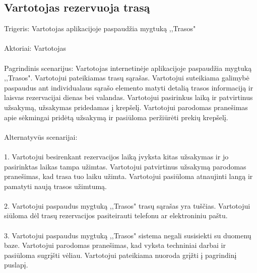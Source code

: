 \documentclass[oneside]{VUMIFPSkursinis}
\begin{document}
\subsection{Vartotojas rezervuoja trasą}
	Trigeris: Vartotojas aplikacijoje paspaudžia mygtuką ,,Trasos"\\ \\
	Aktoriai: Vartotojas\\ \\
	Pagrindinis scenarijus: Vartotojas internetinėje aplikacijoje paspaudžia mygtuką ,,Trasos". Vartotojui pateikiamas trasų sąrašas. Vartotojui suteikiama galimybė paspaudus ant individualaus sąrašo elemento matyti detalią trasos informaciją ir laisvas rezervacijai dienas bei valandas. Vartotojui pasirinkus laiką ir patvirtinus užsakymą, užsakymas pridedamas į krepšelį. Vartotojui parodomas pranešimas apie sėkmingai pridėtą užsakymą ir pasiūloma peržiūrėti prekių krepšelį.\\ \\
	Alternatyvūs scenarijai:\\ \\
1. Vartotojui besirenkant rezervacijos laiką įvyksta kitas užsakymas ir jo pasirinktas laikas tampa užimtas. Vartotojui patvirtinus užsakymą parodomas pranešimas, kad trasa tuo laiku užimta. Vartotojui pasiūloma atnaujinti langą ir pamatyti naują trasos užimtumą.\\ \\
2. Vartotojui paspaudus mygtuką ,,Trasos" trasų sąrašas yra tuščias. Vartotojui siūloma dėl trasų rezervacijos pasiteirauti telefonu ar elektroniniu paštu.\\ \\
3. Vartotojui paspaudus mygtuką ,,Trasos" sistema negali susisiekti su duomenų baze. Vartotojui parodomas pranešimas, kad vyksta techniniai darbai ir pasiūloma sugrįšti vėliau. Vartotojui pateikiama nuoroda grįžti į pagrindinį puslapį.\\ \\
\end{document}

